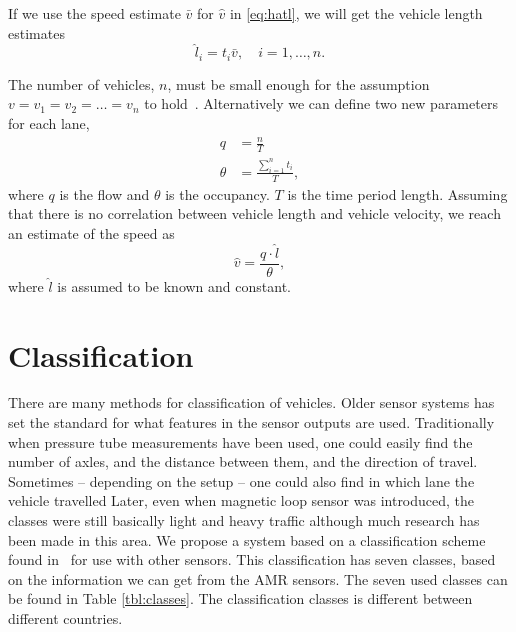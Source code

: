 If we use the speed estimate $\bar{v}$ for $\hat{v}$ in \eqref{eq:hatl}, we will get the vehicle length estimates~\cite{coifman2001}
\begin{equation}
  \hat{l}_i = t_i \bar{v}, \quad i=1, \dots, n.
\end{equation}

The number of vehicles, $n$, must be small enough for the assumption $v = v_1 = v_2 = \ldots = v_n$ to hold~\cite{coifman2001}. Alternatively we can define two new parameters~\cite{coifman2000} for each lane,
\begin{align}
 q&=\frac{n}{T}\\
 \theta&=\frac{\sum_{i=1}^n t_i}{T},
\end{align}
where $q$ is the flow and $\theta$ is the occupancy. $T$ is the time period length. Assuming that there is no correlation between vehicle length and vehicle velocity, we reach an estimate of the speed as
\begin{equation}
 \hat{v} =  \frac{q\cdot{}\hat{l}}{\theta},
\end{equation}
where $\hat{l}$ is assumed to be known and constant.

\section{Classification}
There are many methods for classification of vehicles. Older sensor systems has set the standard for what features in the sensor outputs are used. Traditionally when pressure tube measurements have been used, one could easily find the number of axles, and the distance between them, and the direction of travel. Sometimes -- depending on the setup -- one could also find in which lane the vehicle travelled Later, even when magnetic loop sensor was introduced, the classes were still basically light and heavy traffic although much research has been made in this area. We propose a system based on a classification scheme found in~\cite{sun2000} for use with other sensors. This classification has seven classes, based on the information we can get from the AMR sensors. The seven used classes can be found in Table \ref{tbl:classes}. The classification classes is different between different countries.

